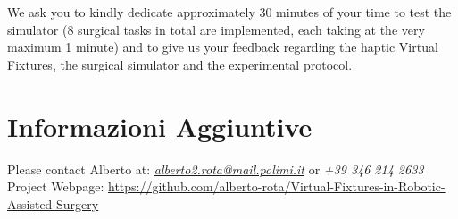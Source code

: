 \documentclass{article}
\begin{document}
\noindent We ask you to kindly dedicate approximately 30 minutes of your time to test the simulator (8 surgical tasks in total are implemented, each taking at the very maximum 1 minute) and to give us your feedback regarding the haptic Virtual Fixtures, the surgical simulator and the experimental protocol.

\section{Informazioni Aggiuntive}
Please contact Alberto at: \textit{\href{mailto:alberto2.rota@mail.polimi.it}{alberto2.rota@mail.polimi.it}} or \textit{+39 346 214 2633}
\newline Project Webpage: \href{https://github.com/alberto-rota/Virtual-Fixtures-in-Robotic-Assisted-Surgery}{https://github.com/alberto-rota/Virtual-Fixtures-in-Robotic-Assisted-Surgery} 


\end{document}
